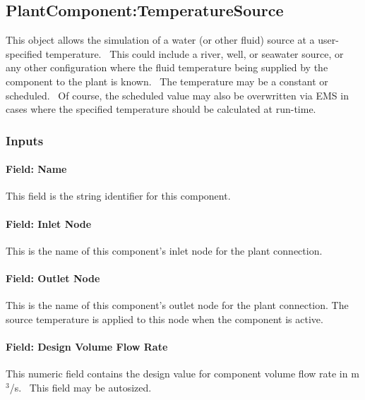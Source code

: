 \subsection{PlantComponent:TemperatureSource}\label{plantcomponenttemperaturesource}

This object allows the simulation of a water (or other fluid) source at a user-specified temperature.~ This could include a river, well, or seawater source, or any other configuration where the fluid temperature being supplied by the component to the plant is known.~ The temperature may be a constant or scheduled.~ Of course, the scheduled value may also be overwritten via EMS in cases where the specified temperature should be calculated at run-time.

\subsubsection{Inputs}\label{inputs-18-006}

\paragraph{Field: Name}\label{field-name-17-005}

This field is the string identifier for this component.

\paragraph{Field: Inlet Node}\label{field-inlet-node-000}

This is the name of this component's inlet node for the plant connection.

\paragraph{Field: Outlet Node}\label{field-outlet-node-000}

This is the name of this component's outlet node for the plant connection. The source temperature is applied to this node when the component is active.

\paragraph{Field: Design Volume Flow Rate}\label{field-design-volume-flow-rate}

This numeric field contains the design value for component volume flow rate in m\(^{3}\)/s.~ This field may be autosized.

